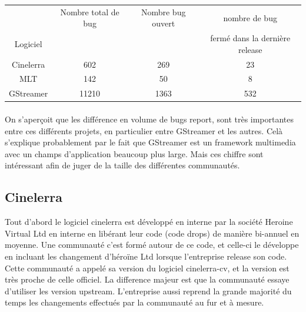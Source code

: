 \begin{center}

  \begin{tabular}{ | c | c | c | c|}

    \hline

         & Nombre total de bug & Nombre bug ouvert & nombre de bug \\

Logiciel &        & & fermé dans la dernière release \\

\hline \hline

Cinelerra & 602 & 269 & 23 \\

\hline

MLT & 142 & 50 & 8 \\

\hline

GStreamer & 11210 & 1363 &  532\\

\hline

  \end{tabular}

\end{center}

\paragraph{}

On s'aperçoit que les différence en volume de bugs report, sont très
importantes entre ces différents projets, en particulier entre
GStreamer et les autres. Celà s'explique probablement par le fait que
GStreamer est un framework multimedia avec un champs d'application
beaucoup plus large. Mais ces chiffre sont intéressant afin de juger
de la taille des différentes communautés.

\subsection {Cinelerra}

Tout d'abord le logiciel cinelerra est développé en interne par la
société Heroine Virtual Ltd en interne en libérant leur code (code
drops) de manière bi-annuel en moyenne. Une communauté c'est formé
autour de ce code, et celle-ci le développe en incluant les changement
d'héroïne Ltd lorsque l'entreprise release son code. Cette communauté
a appelé sa version du logiciel cinelerra-cv, et la version est très
proche de celle officiel. La difference majeur est que la communauté
essaye d'utiliser les version upstream. L'entreprise aussi
reprend la grande majorité du temps les changements effectués par la
communauté au fur et à mesure.

